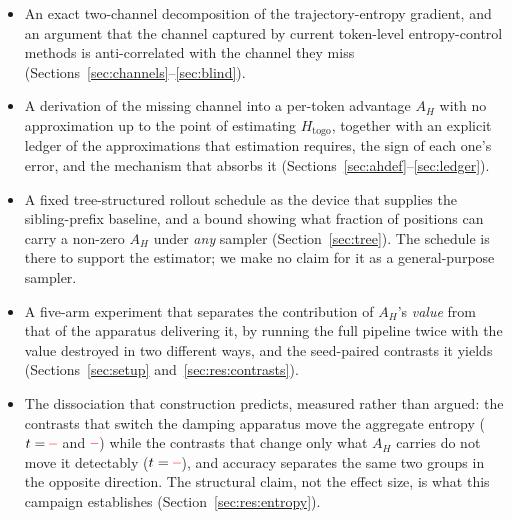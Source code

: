 \documentclass[11pt]{article}
\newcommand{\Htogo}{H_{\mathrm{togo}}}
\newcommand{\AH}{A_{H}}
\providecommand{\PENDING}{\textcolor{red}{\textbf{--}}}
\newcommand{\num}[1]{\ifcsname #1\endcsname\csname #1\endcsname\else\PENDING\fi}
\begin{document}
\begin{itemize}
\item An exact two-channel decomposition of the trajectory-entropy gradient, and an
      argument that the channel captured by current token-level entropy-control
      methods is anti-correlated with the channel they miss
      (Sections~\ref{sec:channels}--\ref{sec:blind}).
\item A derivation of the missing channel into a per-token advantage $\AH$ with no
      approximation up to the point of estimating $\Htogo$, together with an explicit
      ledger of the approximations that estimation requires, the sign of each one's
      error, and the mechanism that absorbs it
      (Sections~\ref{sec:ahdef}--\ref{sec:ledger}).
\item A fixed tree-structured rollout schedule as the device that supplies the
      sibling-prefix baseline, and a bound showing what fraction of positions can
      carry a non-zero $\AH$ under \emph{any} sampler (Section~\ref{sec:tree}). The
      schedule is there to support the estimator; we make no claim for it as a
      general-purpose sampler.
\item A five-arm experiment that separates the contribution of $\AH$'s \emph{value}
      from that of the apparatus delivering it, by running the full pipeline twice
      with the value destroyed in two different ways, and the seed-paired contrasts
      it yields (Sections~\ref{sec:setup} and~\ref{sec:res:contrasts}).
\item The dissociation that construction predicts, measured rather than argued: the
      contrasts that switch the damping apparatus move the aggregate entropy
      ($t = \num{Tsteergrpoentropy}$ and $\num{Tuniformsteerentropy}$) while the
      contrasts that change only what $\AH$ carries do not move it detectably
      ($t = \num{Tsigneduniformentropy}$), and accuracy separates the same two
      groups in the opposite direction. The structural claim, not the effect size,
      is what this campaign establishes (Section~\ref{sec:res:entropy}).
\end{itemize}
\end{document}
